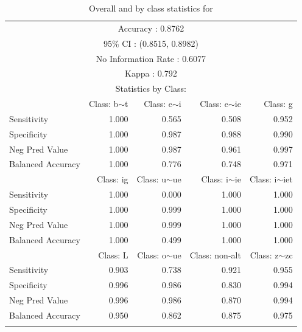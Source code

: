 \begin{table}
  \centering
  \begin{tabular}{lrrrr}
    \lsptoprule
    \multicolumn{5}{c}{Overall Statistics}           \\
    \midrule
    \multicolumn{5}{c}{Accuracy : 0.8762}            \\
    \multicolumn{5}{c}{95\% CI : (0.8515, 0.8982)}   \\
    \multicolumn{5}{c}{No Information Rate : 0.6077} \\
    \multicolumn{5}{c}{Kappa : 0.792}                \\
    \midrule
    \multicolumn{5}{c}{Statistics by Class:}         \\
    \midrule

 & Class: b$\sim$t & Class: e$\sim$i  & Class: e$\sim$ie    & Class: g     \\

    Sensitivity       & 1.000     & 0.565            & 0.508            & 0.952             \\
    Specificity       & 1.000     & 0.987            & 0.988            & 0.990             \\
    Neg Pred Value    & 1.000     & 0.987            & 0.961            & 0.997             \\
    Balanced Accuracy & 1.000     & 0.776            & 0.748            & 0.971             \\
                      & Class: ig & Class: u$\sim$ue & Class: i$\sim$ie & Class: i$\sim$iet \\
    Sensitivity       & 1.000     & 0.000            & 1.000            & 1.000             \\
    Specificity       & 1.000     & 0.999            & 1.000            & 1.000             \\
    Neg Pred Value    & 1.000     & 0.999            & 1.000            & 1.000             \\
    Balanced Accuracy & 1.000     & 0.499            & 1.000            & 1.000             \\

 & Class: L  & Class: o$\sim$ue & Class: non-alt   & Class: z$\sim$zc  \\

    Sensitivity       & 0.903     & 0.738            & 0.921            & 0.955             \\
    Specificity       & 0.996     & 0.986            & 0.830            & 0.994             \\
    Neg Pred Value    & 0.996     & 0.986            & 0.870            & 0.994             \\
    Balanced Accuracy & 0.950     & 0.862            & 0.875            & 0.975             \\
    \lspbottomrule
  \end{tabular}
  \caption{Overall and by class statistics for }
  \label{tab:spanish-verbs-minor-v-stats}
\end{table}

